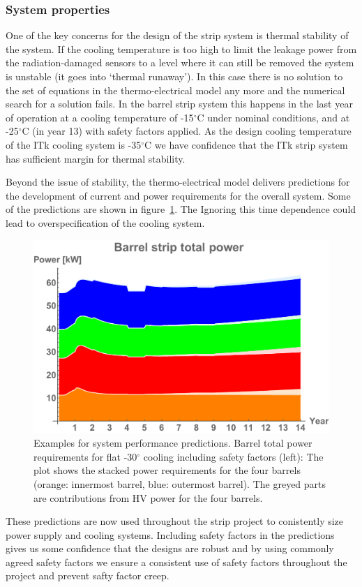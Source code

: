 \subsubsection{System properties}
One of the key concerns for the design of the strip system is thermal stability of the system. If the cooling temperature is too high to limit the leakage power from the radiation-damaged sensors to a level where it can still be removed the system is unstable (it goes into `thermal runaway'). In this case there is no solution to the set of equations in the thermo-electrical model any more and the numerical search for a solution fails. In the barrel strip system this happens in the last year of operation at a cooling temperature of -15$^\circ$C under nominal conditions, and at -25$^\circ$C (in year 13) with safety factors applied. As the design cooling temperature of the ITk cooling system is -35$^\circ$C we have confidence that the ITk strip system has sufficient margin for thermal stability.  

Beyond the issue of stability, the thermo-electrical model delivers predictions for the development of current and power requirements for the overall system. Some of the predictions are shown in figure~\ref{fig:systemperformance}. The Ignoring this time dependence could lead to overspecification of the cooling system.

\begin{figure}[ht]
\centering
\includegraphics[width=0.4\linewidth]{figures/Totalbarrelpower-30.pdf}
\caption{Examples for system performance predictions. Barrel total power requirements for flat -30$^\circ$ cooling including safety factors (left): The plot shows the stacked power requirements for the four barrels (orange: innermost barrel, blue: outermost barrel). The greyed parts are contributions from HV power for the four barrels.}
\label{fig:systemperformance}
\end{figure}

These predictions are now used throughout the strip project to conistently size power supply and cooling systems. Including safety factors in the predictions gives us some confidence that the designs are robust and by using commonly agreed safety factors we ensure a consistent use of safety factors throughout the project and prevent safty factor creep.  

